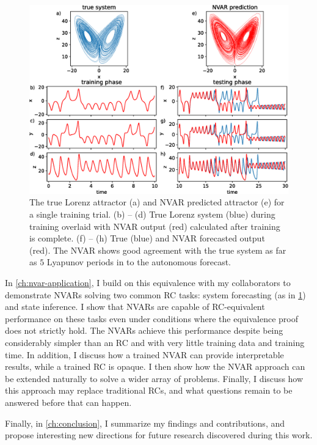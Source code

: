 \begin{figure}
  \includegraphics[width=\textwidth]{figures/nvar-predict-lorenz}
  \caption{The true Lorenz attractor (a) and NVAR predicted attractor
    (e) for a single training trial. (b) -- (d) True Lorenz system
    (blue) during training overlaid with NVAR output (red) calculated
    after training is complete. (f) -- (h) True (blue) and NVAR
    forecasted output (red). The NVAR shows good agreement with the
    true system as far as $5$ Lyapunov periods in to the autonomous
    forecast.}
  \label{fig:intro-nvar-predict-lorenz}
\end{figure}

In \cref{ch:nvar-application}, I build on this equivalence with my
collaborators to demonstrate NVARs solving two common RC tasks: system
forecasting (as in \cref{fig:intro-nvar-predict-lorenz}) and state
inference.  I show that NVARs are capable of RC-equivalent performance
on these tasks even under conditions where the equivalence proof does
not strictly hold. The NVARs achieve this performance despite being
considerably simpler than an RC and with very little training data and
training time. In addition, I discuss how a trained NVAR can provide
interpretable results, while a trained RC is opaque. I then show how
the NVAR approach can be extended naturally to solve a wider array of
problems. Finally, I discuss how this approach may replace traditional
RCs, and what questions remain to be answered before that can happen.

Finally, in \cref{ch:conclusion}, I summarize my findings and
contributions, and propose interesting new directions for future
research discovered during this work.
